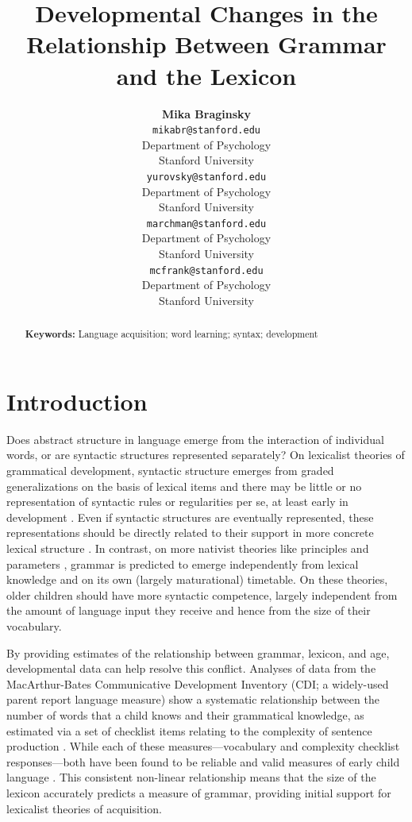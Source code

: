 \documentclass[10pt,letterpaper]{article}
\title{Developmental Changes in the Relationship Between Grammar and the Lexicon}
\author{{\large \bf Mika Braginsky} \\
  \texttt{mikabr@stanford.edu} \\
  Department of Psychology \\
  Stanford University
  \And {\large \bf Daniel Yurovsky} \\
  \texttt{yurovsky@stanford.edu} \\
  Department of Psychology \\
  Stanford University
    \And {\large \bf Virginia Marchman} \\
    \texttt{marchman@stanford.edu} \\
  Department of Psychology \\
  Stanford University
    \And {\large \bf Michael C. Frank}\\
    \texttt{mcfrank@stanford.edu} \\
  Department of Psychology \\
  Stanford University}
\begin{document}
\maketitle

\begin{abstract}


\textbf{Keywords:} 
Language acquisition; word learning; syntax; development
\end{abstract}

\section{Introduction}

Does abstract structure in language emerge from the interaction of individual words, or are syntactic structures represented separately? On lexicalist theories of grammatical development, syntactic structure emerges from graded generalizations on the basis of lexical items and there may be little or no representation of syntactic rules or regularities per se, at least early in development \cite{tomasello2001,tomasello2003}. Even if syntactic structures are eventually represented, these representations should be directly related to their support in more concrete lexical structure \cite{bannard2009,bod2009}. In contrast, on more nativist theories like principles and parameters \cite{chomsky1981, baker2005}, grammar is predicted to emerge independently from lexical knowledge and on its own (largely maturational) timetable. On these theories, older children should have more syntactic competence, largely independent from the amount of language input they receive and hence from the size of their vocabulary.

By providing estimates of the relationship between grammar, lexicon, and age,  developmental data can help resolve this conflict. Analyses of data from the MacArthur-Bates Communicative Development Inventory (CDI; a widely-used parent report language measure) show a systematic relationship between the number of words that a child knows and their grammatical knowledge, as estimated via a set of checklist items relating to the complexity of sentence production \cite{bates1997,caselli1999}. While each of these measures---vocabulary and complexity checklist responses---both have been found to be reliable and valid measures of early child language \cite{fenson1994,fenson2007}.  This consistent non-linear relationship means that the size of the lexicon accurately predicts a measure of grammar, providing initial support for lexicalist theories of acquisition.
\end{document}
